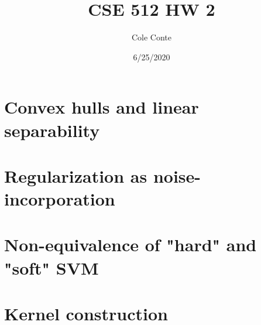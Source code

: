 \documentclass{article}
\begin{document}
\title{CSE 512 HW 2}
\author{Cole Conte}
\date{6/25/2020}

\maketitle

\pagebreak
\section{Convex hulls and linear separability}

\section{Regularization as noise-incorporation}

\section{Non-equivalence of "hard" and "soft" SVM}

\section{Kernel construction}
\end{document}
